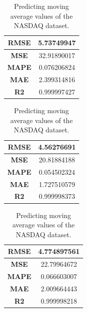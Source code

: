 \begin{table}[H]
	\centering
	\begin{minipage}{0.3\textwidth}
		\centering
		\begin{tabular}{|c|c|}
			\hline
			\textbf{RMSE} & 5.73749947  \\
			\hline
			\textbf{MSE}  & 32.91890017 \\
			\hline
			\textbf{MAPE} & 0.076206824 \\
			\hline
			\textbf{MAE}  & 2.399314816 \\
			\hline
			\textbf{R2}   & 0.999997427 \\
			\hline
		\end{tabular}
	\end{minipage}
	\begin{minipage}{0.3\textwidth}
		\centering
		\begin{tabular}{|c|c|}
			\hline
			\textbf{RMSE} & 4.56276691  \\
			\hline
			\textbf{MSE}  & 20.81884188 \\
			\hline
			\textbf{MAPE} & 0.054502324 \\
			\hline
			\textbf{MAE}  & 1.727510579 \\
			\hline
			\textbf{R2}   & 0.999998373 \\
			\hline
		\end{tabular}
	\end{minipage}
	\begin{minipage}{0.3\textwidth}
		\centering
		\begin{tabular}{|c|c|}
			\hline
			\textbf{RMSE} & 4.774897561 \\
			\hline
			\textbf{MSE}  & 22.79964672 \\
			\hline
			\textbf{MAPE} & 0.066603007 \\
			\hline
			\textbf{MAE}  & 2.009664443 \\
			\hline
			\textbf{R2}   & 0.999998218 \\
			\hline
		\end{tabular}
	\end{minipage}
	\caption{Predicting moving average values of the NASDAQ dataset.}
	\label{metric:nasdaq_mva}
\end{table}
